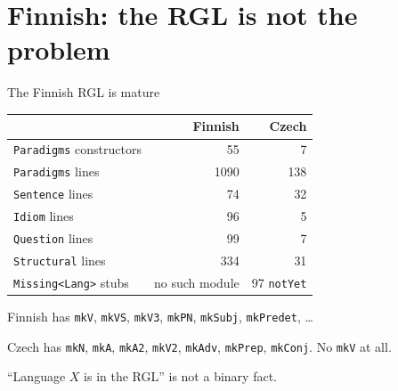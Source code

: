 \documentclass[10pt,aspectratio=169]{beamer}
\newcommand{\bad}[1]{\textcolor{warn}{#1}}
\newcommand{\ok}[1]{\textcolor{good}{#1}}
\begin{document}
\section{Finnish: the RGL is not the problem}

\begin{frame}{The Finnish RGL is mature}
  \small
  \begin{center}
  \begin{tabular}{lrr}
    \toprule
    & \textbf{Finnish} & \textbf{Czech} \\
    \midrule
    \texttt{Paradigms} constructors & 55 & 7 \\
    \texttt{Paradigms} lines        & 1090 & 138 \\
    \texttt{Sentence} lines         & 74 & 32 \\
    \texttt{Idiom} lines            & 96 & 5 \\
    \texttt{Question} lines         & 99 & 7 \\
    \texttt{Structural} lines       & 334 & 31 \\
    \midrule
    \texttt{Missing<Lang>} stubs    & \ok{no such module} & \bad{97 \texttt{notYet}} \\
    \bottomrule
  \end{tabular}
  \end{center}

  \vspace{0.8em}
  Finnish has \texttt{mkV}, \texttt{mkVS}, \texttt{mkV3}, \texttt{mkPN},
  \texttt{mkSubj}, \texttt{mkPredet}, \dots{}

  Czech has \texttt{mkN}, \texttt{mkA}, \texttt{mkA2}, \texttt{mkV2},
  \texttt{mkAdv}, \texttt{mkPrep}, \texttt{mkConj}. \bad{No \texttt{mkV} at all.}

  \vspace{0.5em}
  \small ``Language $X$ is in the RGL'' is not a binary fact.
\end{frame}
\end{document}
